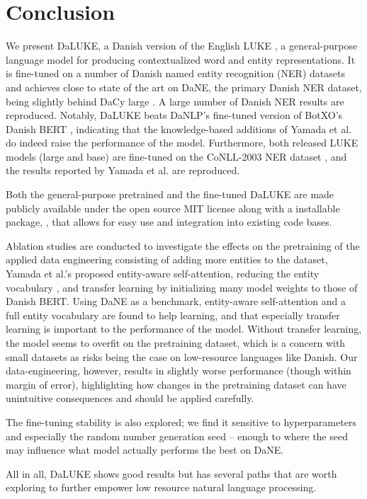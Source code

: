 \documentclass[main.tex]{subfiles}
\begin{document}
\chapter{Conclusion}
We present DaLUKE, a Danish version of the English LUKE \cite{yamada2020luke}, a general-purpose language model for producing contextualized word and entity representations.
It is fine-tuned on a number of Danish named entity recognition (NER) datasets and achieves close to state of the art on DaNE, the primary Danish NER dataset, being slightly behind DaCy large \cite{enevoldsen2020dacy}.
A large number of Danish NER results are reproduced.
Notably, DaLUKE beats DaNLP's fine-tuned version of BotXO's Danish BERT \cite{danlp2021, botxo2019dabert}, indicating that the knowledge-based additions of Yamada et al. \cite{yamada2020luke} do indeed raise the performance of the model.
Furthermore, both released LUKE models (large and base) are fine-tuned on the CoNLL-2003 NER dataset \cite{tjang2003conll}, and the results reported by Yamada et al. are reproduced.

Both the general-purpose pretrained and the fine-tuned DaLUKE are made publicly available under the open source MIT license \cite{mitlicense} along with a  installable package, , that allows for easy use and integration into existing code bases.

Ablation studies are conducted to investigate the effects on the pretraining of the applied data engineering consisting of adding more entities to the dataset, Yamada et al.'s proposed entity-aware self-attention, reducing the entity vocabulary \cite{yamada2020luke}, and transfer learning by initializing many model weights to those of Danish BERT.
Using DaNE as a benchmark, entity-aware self-attention and a full entity vocabulary are found to help learning, and that especially transfer learning is important to the performance of the model.
Without transfer learning, the model seems to overfit on the pretraining dataset, which is a concern with small datasets as risks being the case on low-resource languages like Danish.
Our data-engineering, however, results in slightly worse performance (though within margin of error), highlighting how changes in the pretraining dataset can have unintuitive consequences and should be applied carefully.

The fine-tuning stability is also explored; we find it sensitive to hyperparameters and especially the random number generation seed -- enough to where the seed may influence what model actually performs the best on DaNE.

All in all, DaLUKE shows good results but has several paths that are worth exploring to further empower low resource natural language processing.
\end{document}
